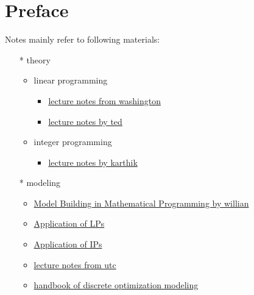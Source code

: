 \chapter*{Preface}

Notes mainly refer to following materials:


\begin{itemize}
    \item[*] theory
    \begin{itemize}
        \item linear programming
            \begin{itemize}
                \item \href{https://sites.math.washington.edu/~burke/crs/408f/notes/lpnotes/lp_intro.pdf}{lecture notes from washington}
                \item \href{https://coral.ise.lehigh.edu/~ted/teaching/ie406/}{lecture notes by ted}
            \end{itemize}
        \item integer programming
            \begin{itemize}
                \item \href{https://karthik.ise.illinois.edu/courses/ie511/lectures-sp-21/lecture-1.pdf}{lecture notes by karthik}
            \end{itemize}
    \end{itemize}
    \item[*] modeling
    \begin{itemize}
        \item \href{}{Model Building in Mathematical Programming by willian}
        \item \href{https://sites.math.washington.edu/~perkins/381AWin14/handouts/chapter3.pdf}{Application of LPs}
        \item \href{https://sites.math.washington.edu/~perkins/381AWin14/handouts/chapter9.pdf}{Application of IPs}
        \item \href{https://www.hds.utc.fr/~dnace/dokuwiki/_media/fr/lp-modelling_upt_p2021.pdf}{lecture notes from utc}
        \item \href{https://pws.npru.ac.th/sartthong/data/files/Handbook_on_Modelling_for_Discrete_Optimization.pdf}{handbook of discrete optimization modeling}
    \end{itemize}
\end{itemize}






